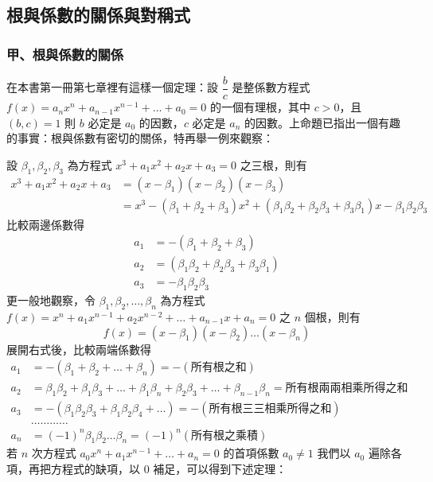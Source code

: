 \subsection{根與係數的關係與對稱式}\label{sec:b6s-2-3}
\resetsectcounters

\subsubsection*{甲、根與係數的關係}\label{subsec:b6s-2-3-a}

在本書第一冊第七章裡有這樣一個定理：設 $\dfrac{b}{c}$ 是整係數方程式 $f(x) = a_n x^n + a_{n-1} x^{n-1} + \dots + a_0 = 0$ 的一個有理根，其中 $c > 0$，且 $(b, c)=1$ 則 $b$ 必定是 $a_0$ 的因數，$c$ 必定是 $a_n$ 的因數。上命題已指出一個有趣的事實：根與係數有密切的關係，特再舉一例來觀察：

設 $\beta_1, \beta_2, \beta_3$ 為方程式 $x^3 + a_1 x^2 + a_2 x + a_3 = 0$ 之三根，則有
\begin{align*}
x^3 + a_1 x^2 + a_2 x + a_3 &= (x-\beta_1)(x-\beta_2)(x-\beta_3) \\
&= x^3 - (\beta_1+\beta_2+\beta_3)x^2 + (\beta_1\beta_2+\beta_2\beta_3+\beta_3\beta_1)x - \beta_1\beta_2\beta_3
\end{align*}
比較兩邊係數得
\begin{align*}
a_1 &= -(\beta_1+\beta_2+\beta_3) \\
a_2 &= (\beta_1\beta_2+\beta_2\beta_3+\beta_3\beta_1) \\
a_3 &= -\beta_1\beta_2\beta_3
\end{align*}
更一般地觀察，令 $\beta_1, \beta_2, \dots, \beta_n$ 為方程式 $f(x) = x^n + a_1 x^{n-1} + a_2 x^{n-2} + \dots + a_{n-1} x + a_n = 0$ 之 $n$ 個根，則有
\[ f(x) = (x-\beta_1)(x-\beta_2)\dots(x-\beta_n) \]
展開右式後，比較兩端係數得
\begin{equation}
\begin{aligned}
a_1 &= -(\beta_1+\beta_2+\dots+\beta_n) = -(\text{所有根之和}) \\
a_2 &= \beta_1\beta_2+\beta_1\beta_3+\dots+\beta_1\beta_n+\beta_2\beta_3+\dots+\beta_{n-1}\beta_n = \text{所有根兩兩相乘所得之和} \\
a_3 &= -(\beta_1\beta_2\beta_3+\beta_1\beta_2\beta_4+\dots) = -(\text{所有根三三相乘所得之和}) \\
&\dots\dots\dots\dots \\
a_n &= (-1)^n \beta_1\beta_2\dots\beta_n = (-1)^n (\text{所有根之乘積})
\end{aligned} \tag{I} \label{eq:b6s-2-3-I}
\end{equation}
若 $n$ 次方程式 $a_0 x^n + a_1 x^{n-1} + \dots + a_n = 0$ 的首項係數 $a_0 \ne 1$ 我們以 $a_0$ 遍除各項，再把方程式的缺項，以 0 補足，可以得到下述定理：

